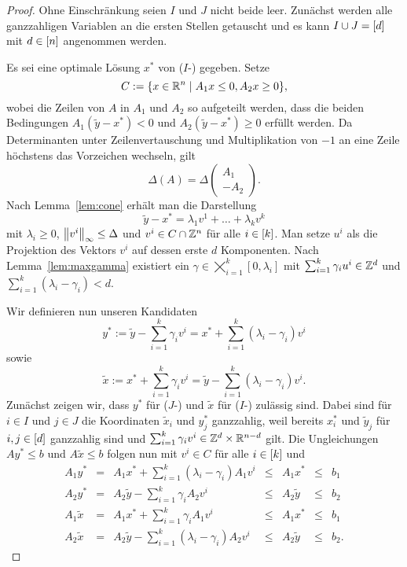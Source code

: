 \begin{proof}
	Ohne Einschränkung seien $I$ und $J$ nicht beide leer.
	Zunächst werden alle ganzzahligen Variablen an die ersten Stellen getauscht und es kann $I\cup J=[d]$ mit $d\in[n]$ angenommen werden.
	
	Es sei eine optimale Lösung $x^*$ von ($I$-\MIPR) gegeben.
	Setze $$C:=\{ x\in\mathbb{R}^n \mid A_1 x \leq 0, A_2x\geq0 \},$$ wobei die Zeilen von $A$ in $A_1$ und $A_2$ so aufgeteilt werden, dass die beiden Bedingungen $A_1 (\tilde{y}-x^*)<0$ und $A_2 (\tilde{y}-x^*)\geq0$ erfüllt werden.
	Da Determinanten unter Zeilenvertauschung und Multiplikation von $-1$ an eine Zeile höchstens das Vorzeichen wechseln, gilt
	$$\Delta(A)=\Delta\begin{pmatrix} A_1 \\ -A_2 \end{pmatrix}.$$
	Nach Lemma~\ref{lem:cone} erhält man die Darstellung 
	$$\tilde{y}-x^* = \lambda_1v^1 + \dots+\lambda_kv^k$$
	mit $\lambda_i\geq0$, $\left\lVert v^i\right\rVert_\infty\leq \Delta$ und $v^i\in C\cap\mathbb{Z}^n$ für alle $i\in[k]$.
	Man setze $u^i$ als die Projektion des Vektors $v^i$ auf dessen erste $d$ Komponenten.
	Nach Lemma~\ref{lem:maxgamma} existiert ein $\gamma\in\bigtimes_{i=1}^k[0,\lambda_i]$ mit  $\sum_{i=1}^k\gamma_iu^i\in\mathbb{Z}^d$ und $\sum_{i=1}^k(\lambda_i -\gamma_i)<d$.
	
	Wir definieren nun unseren Kandidaten $$y^*:=\tilde{y}-\sum_{i=1}^k\gamma_iv^i=x^*+\sum_{i=1}^k(\lambda_i-\gamma_i)v^i$$
	sowie $$\tilde{x}:=x^*+\sum_{i=1}^k\gamma_iv^i=\tilde{y}-\sum_{i=1}^k(\lambda_i-\gamma_i)v^i.$$
	Zunächst zeigen wir, dass $y^*$ für ($J$-\MIPR) und $\tilde{x}$ für ($I$-\MIPR) zulässig sind.
	Dabei sind für $i\in I$ und $j\in J$ die Koordinaten $\tilde{x}_i$ und $y^*_j$ ganzzahlig, weil bereits $x^*_i$ und $\tilde{y}_j$ für $i,j\in[d]$ ganzzahlig sind und $\sum_{i=1}^k\gamma_iv^i\in\mathbb{Z}^d\times\mathbb{R}^{n-d}$ gilt.
	Die Ungleichungen $Ay^*\leq b$ und $A\tilde{x}\leq b$ folgen nun mit $v^i\in C$ für alle $i\in[k]$ und 
	$$
	\begin{array}{lllllll}
	A_1 y^*&=&A_1x^*+\sum_{i=1}^k(\lambda_i-\gamma_i)A_1v^i &\leq& A_1 x^* &\leq&b_1\\
	A_2 y^*&=&A_2\tilde{y}-\sum_{i=1}^k\gamma_iA_2v^i &\leq& A_2\tilde{y} &\leq& b_2\\
	A_1\tilde{x} &=&A_1x^*+\sum_{i=1}^k \gamma_iA_1v^i &\leq& A_1x^* &\leq&b_1\\
	A_2\tilde{x} &=&A_2\tilde{y}-\sum_{i=1}^k(\lambda_i-\gamma_i)A_2v^i&\leq& A_2\tilde{y}&\leq& b_2.
	\end{array}
	$$
	

\end{proof}
